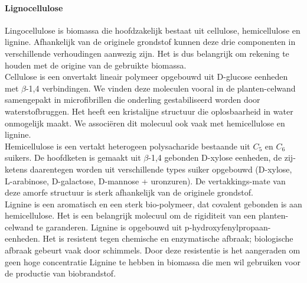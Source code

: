 \documentclass[a4paper,kul]{kulakarticle} %
\begin{document}
\paragraph{Lignocellulose}
Lingocellulose is biomassa die hoofdzakelijk bestaat uit cellulose, hemicellulose en lignine. Afhankelijk van de originele grondstof kunnen deze drie componenten in verschillende verhoudingen aanwezig zijn. Het is dus belangrijk om rekening te houden met de origine van de gebruikte biomassa. 
\\

Cellulose is een onvertakt lineair polymeer opgebouwd uit D-glucose eenheden met $\beta$-1,4 verbindingen. We vinden deze moleculen vooral in de planten-celwand samengepakt in microfibrillen die onderling gestabiliseerd worden door waterstofbruggen. Het heeft een kristalijne structuur die oplosbaarheid in water onmogelijk maakt. We associëren dit molecuul ook vaak met hemicellulose en lignine.
\\

Hemicellulose is een vertakt heterogeen polysacharide bestaande uit $C_5$ en $C_6$ suikers. De hoofdketen is gemaakt uit $\beta$-1,4 gebonden D-xylose eenheden, de zij-ketens daarentegen worden uit verschillende types suiker opgebouwd (D-xylose, L-arabinose, D-galactose, D-mannose + uronzuren). De vertakkings-mate van deze amorfe structuur is sterk afhankelijk van de originele grondstof. 
\\
\newpage
Lignine is een aromatisch en een sterk bio-polymeer, dat covalent gebonden is aan hemicellulose. Het is een belangrijk molecuul om de rigiditeit van een planten-celwand te garanderen. Lignine is opgebouwd uit p-hydroxyfenylpropaan-eenheden. Het is resistent tegen chemische en enzymatische afbraak; biologische afbraak gebeurt vaak door schimmels. Door deze resistentie is het aangeraden om geen hoge concentratie Lignine te hebben in biomassa die men wil gebruiken voor de productie van biobrandstof.
\end{document}
